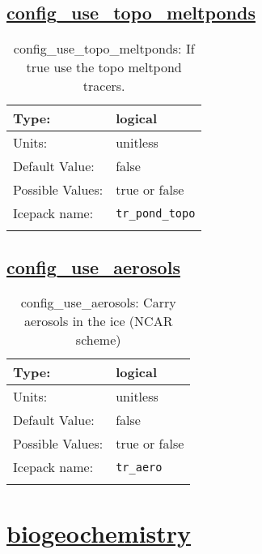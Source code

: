 \subsection[config\_use\_topo\_meltponds]{\hyperref[sec:nm_tab_column_tracers]{config\_use\_topo\_meltponds}}
\label{subsec:nm_sec_config_use_topo_meltponds}
\begin{center}
\begin{longtable}{| p{2.0in} || p{4.0in} |}
    \hline
    Type: & logical \\
    \hline
    Units: & \si{unitless} \\
    \hline
    Default Value: & false \\
    \hline
    Possible Values: & true or false \\
    \hline
    Icepack name: & \verb+tr_pond_topo+ \\
    \hline
    \caption{config\_use\_topo\_meltponds: If true use the topo meltpond tracers.}
\end{longtable}
\end{center}
\subsection[config\_use\_aerosols]{\hyperref[sec:nm_tab_column_tracers]{config\_use\_aerosols}}
\label{subsec:nm_sec_config_use_aerosols}
\begin{center}
\begin{longtable}{| p{2.0in} || p{4.0in} |}
    \hline
    Type: & logical \\
    \hline
    Units: & \si{unitless} \\
    \hline
    Default Value: & false \\
    \hline
    Possible Values: & true or false \\
    \hline
    Icepack name: & \verb+tr_aero+ \\
    \hline
    \caption{config\_use\_aerosols: Carry aerosols in the ice (NCAR scheme)}
\end{longtable}
\end{center}
\section[biogeochemistry]{\hyperref[sec:nm_tab_biogeochemistry]{biogeochemistry}}
\label{sec:nm_sec_biogeochemistry}
